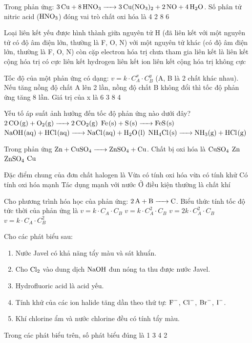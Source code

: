 \documentclass[12pt,a4paper]{article}
\begin{document}
\begin{ex}
Trong phản ứng: $\ce{3Cu + 8HNO3 -> 3Cu(NO3)2 + 2NO + 4H2O}$. Số phân tử nitric acid ($\ce{HNO3}$) đóng vai trò chất oxi hóa là
\choice
{4}
{2}
{8}
{6}
\end{ex}

\begin{ex}
Loại liên kết yếu được hình thành giữa nguyên tử H (đã liên kết với một nguyên tử có độ âm điện lớn, thường là F, O, N) với một nguyên tử khác (có độ âm điện lớn, thường là F, O, N) còn cặp electron hóa trị chưa tham gia liên kết là
\choice
{liên kết cộng hóa trị có cực}
{liên kết hydrogen}
{liên kết ion}
{liên kết cộng hóa trị không cực}
\end{ex}

\begin{ex}
Tốc độ của một phản ứng có dạng: $v = k \cdot C_A^x \cdot C_B^y$ (A, B là 2 chất khác nhau). Nếu tăng nồng độ chất A lên 2 lần, nồng độ chất B không đổi thì tốc độ phản ứng tăng 8 lần. Giá trị của x là
\choice
{6}
{3}
{8}
{4}
\end{ex}

\begin{ex}
Yếu tố áp suất ảnh hưởng đến tốc độ phản ứng nào dưới đây?
\choice
{$\ce{2CO(g) + O2(g) -> 2CO2(g)}$}
{$\ce{Fe(s) + S(s) -> FeS(s)}$}
{$\ce{NaOH(aq) + HCl(aq) -> NaCl(aq) + H2O(l)}$}
{$\ce{NH4Cl(s) -> NH3(g) + HCl(g)}$}
\end{ex}

\begin{ex}
Trong phản ứng $\ce{Zn + CuSO4 -> ZnSO4 + Cu}$. Chất bị oxi hóa là
\choice
{$\ce{CuSO4}$}
{$\ce{Zn}$}
{$\ce{ZnSO4}$}
{$\ce{Cu}$}
\end{ex}

\begin{ex}
Đặc điểm chung của đơn chất halogen là
\choice
{Vừa có tính oxi hóa vừa có tính khử}
{Có tính oxi hóa mạnh}
{Tác dụng mạnh với nước}
{Ở điều kiện thường là chất khí}
\end{ex}

\begin{ex}
Cho phương trình hóa học của phản ứng: $\ce{2A + B -> C}$. Biểu thức tính tốc độ tức thời của phản ứng là
\choice
{$v = k \cdot C_A \cdot C_B$}
{$v = k \cdot C_A^2 \cdot C_B$}
{$v = 2k \cdot C_A^2 \cdot C_B$}
{$v = k \cdot C_A \cdot C_B^2$}
\end{ex}

\begin{ex}
Cho các phát biểu sau:
\begin{enumerate}[(1)]
	\item Nước Javel có khả năng tẩy màu và sát khuẩn.
	\item Cho $\ce{Cl2}$ vào dung dịch $\ce{NaOH}$ đun nóng ta thu được nước Javel.
	\item Hydrofluoric acid là acid yếu.
	\item Tính khử của các ion halide tăng dần theo thứ tự: $\ce{F-}$, $\ce{Cl-}$, $\ce{Br-}$, $\ce{I-}$.
	\item Khí chlorine ẩm và nước chlorine đều có tính tẩy màu.
\end{enumerate}
Trong các phát biểu trên, số phát biểu đúng là
\choice
{1}
{3}
{4}
{2}
\end{ex}
\end{document}
